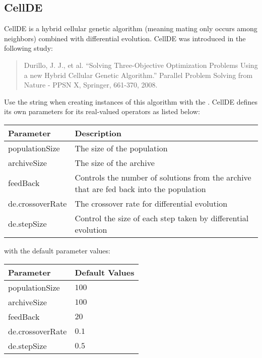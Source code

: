 \subsection{CellDE}
CellDE is a hybrid cellular genetic algorithm (meaning mating only occurs among neighbors) combined with differential evolution.  CellDE was introduced in the following study:
\begin{quote}
Durillo, J. J., et al.  ``Solving Three-Objective Optimization Problems Using a new Hybrid Cellular Genetic Algorithm.''  Parallel Problem Solving from Nature - PPSN X, Springer, 661-370, 2008.
\end{quote}
Use the string  when creating instances of this algorithm with the .  CellDE defines its own parameters for its real-valued operators as listed below:
\newline
\newline
\begin{tabularx}{\linewidth}{lX}
  \hline
  Parameter & Description \\
  \hline
  populationSize & The size of the population \\
  archiveSize & The size of the archive \\
  feedBack & Controls the number of solutions from the archive that are fed back into the population \\
  de.crossoverRate & The crossover rate for differential evolution \\
  de.stepSize & Control the size of each step taken by differential evolution \\
  \hline
\end{tabularx}
\newline
\newline
with the default parameter values:
\newline
\newline
\begin{tabularx}{\linewidth}{lX}
  \hline
  Parameter & Default Values \\
  \hline
  populationSize & $100$ \\
  archiveSize & $100$ \\
  feedBack & $20$ \\
  de.crossoverRate & $0.1$ \\
  de.stepSize & $0.5$ \\
  \hline
\end{tabularx}

